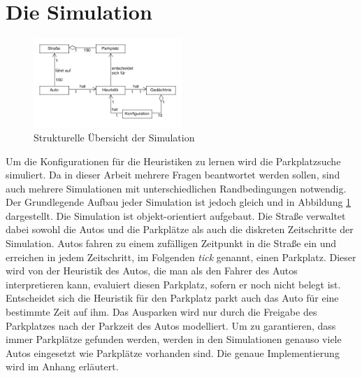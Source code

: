 \section{Die Simulation}
\begin{figure}
\includegraphics[width=0.5\textwidth]{uml/simOverview.png}
\caption{Strukturelle Übersicht der Simulation}\label{fig_simOver}
\end{figure}
Um die Konfigurationen für die Heuristiken zu lernen wird die Parkplatzsuche simuliert. Da in dieser Arbeit mehrere Fragen beantwortet werden sollen, sind auch mehrere Simulationen mit unterschiedlichen Randbedingungen notwendig. Der Grundlegende Aufbau jeder Simulation ist jedoch gleich und in Abbildung \ref{fig_simOver} dargestellt. Die Simulation ist objekt-orientiert aufgebaut. Die Straße verwaltet dabei sowohl die Autos und die Parkplätze als auch die diskreten Zeitschritte der Simulation. Autos fahren zu einem zufälligen Zeitpunkt in die Straße ein und erreichen in jedem Zeitschritt, im Folgenden \emph{tick} genannt, einen Parkplatz. Dieser wird von der Heuristik des Autos, die man als den Fahrer des Autos interpretieren kann, evaluiert diesen Parkplatz, sofern er noch nicht belegt ist. Entscheidet sich die Heuristik für den Parkplatz parkt auch das Auto für eine bestimmte Zeit auf ihm. Das Ausparken wird nur durch die Freigabe des Parkplatzes nach der Parkzeit des Autos modelliert. Um zu garantieren, dass immer Parkplätze gefunden werden, werden in den Simulationen genauso viele Autos eingesetzt wie Parkplätze vorhanden sind. Die genaue Implementierung wird im Anhang erläutert.

